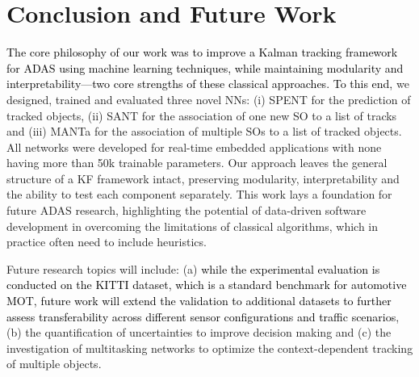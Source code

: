 \documentclass[letterpaper, 10 pt, journal, twoside]{IEEEtran}
\newcommand{\red}[1]{\textcolor{black}{#1}}
\begin{document}
\section{Conclusion and Future Work}
\red{The core philosophy of our work was to improve a Kalman tracking framework for \ac{ADAS} using machine learning techniques, while maintaining modularity and interpretability—two core strengths of these classical approaches. To this end,} we designed, trained and evaluated three novel \ac{NN}s: (i) SPENT for the prediction of tracked objects, (ii) SANT for the association of one new \ac{SO} to a list of tracks and (iii) MANTa for the association of multiple SOs to a list of tracked objects. All networks were developed for real-time embedded applications with none having more than 50k trainable parameters.
Our approach leaves the general structure of a \ac{KF} framework intact, preserving modularity, interpretability and the ability to test each component separately. This work lays a foundation for future \ac{ADAS} research, highlighting the potential of data-driven software development in overcoming the limitations of classical algorithms, which in practice often need to include heuristics.

Future research topics will include: (a) \red{while the experimental evaluation is conducted on the KITTI dataset, which is a standard benchmark for automotive \ac{MOT}, future work will extend the validation to additional datasets to further assess transferability across different sensor configurations and traffic scenarios}, (b) the quantification of uncertainties to improve decision making and (c) the investigation of multitasking networks to optimize the context-dependent tracking of multiple objects.
\end{document}
